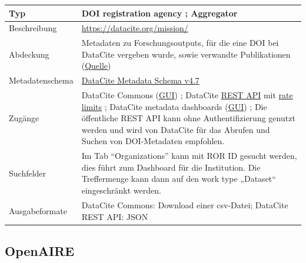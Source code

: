 \documentclass[
  ngerman,
  letterpaper,
  DIV=11]{scrreprt}
\newcounter{none} %
\begin{document}
{\def\LTcaptype{none} %
\begin{longtable}[]{@{}
  >{\raggedright\arraybackslash}p{}
  >{\raggedright\arraybackslash}p{}@{}}
\toprule\noalign{}
\begin{minipage}[b]{\linewidth}\raggedright
Typ
\end{minipage} & \begin{minipage}[b]{\linewidth}\raggedright
DOI registration agency ; Aggregator
\end{minipage} \\
\midrule\noalign{}
\endhead
\bottomrule\noalign{}
\endlastfoot
Beschreibung & \url{https://datacite.org/mission/} \\
Abdeckung & Metadaten zu Forschungsoutputs, für die eine DOI bei
DataCite vergeben wurde, sowie verwandte Publikationen
(\href{https://support.datacite.org/docs/works-in-datacite-commons}{Quelle}) \\
Metadatenschema & \href{https://doi.org/10.14454/qdd3-ps68}{DataCite
Metadata Schema v4.7} \\
Zugänge & DataCite Commons (\href{https://commons.datacite.org/}{GUI}) ;
DataCite \href{https://support.datacite.org/docs/api}{REST API} mit
\href{https://support.datacite.org/docs/rate-limit}{rate limits} ;
DataCite metadata dashboards
(\href{https://metadata.datacite.org/}{GUI}) ; Die öffentliche REST API
kann ohne Authentifizierung genutzt werden und wird von DataCite für das
Abrufen und Suchen von DOI-Metadaten empfohlen. \\
Suchfelder & Im Tab ``Organizations'' kann mit ROR ID gesucht werden,
dies führt zum Dashboard für die Institution. Die Treffermenge kann dann
auf den work type „Dataset`` eingeschränkt werden. \\
Ausgabeformate & DataCite Commons: Download einer csv-Datei; DataCite
REST API: JSON \\
\end{longtable}
}

\subsection{OpenAIRE}\label{openaire}
\end{document}
